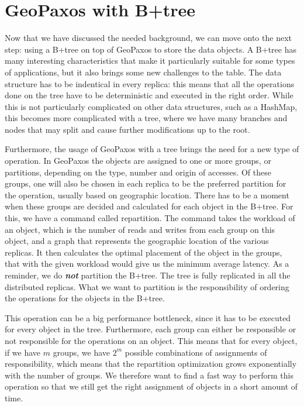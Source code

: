 \chapter{GeoPaxos with B+tree}\label{sec:geopaxos-with-B+tree}
Now that we have discussed the needed background, we can move onto the next step: using a B+tree\citep{b+tree} on top of GeoPaxos to store the data objects. A B+tree has many interesting characteristics that make it particularly suitable for some types of applications, but it also brings some new challenges to the table. The data structure has to be indentical in every replica: this means that all the operations done on the tree have to be deterministic and executed in the right order. While this is not particularly complicated on other data structures, such as a HashMap, this becomes more complicated with a tree, where we have many branches and nodes that may split and cause further modifications up to the root.

Furthermore, the usage of GeoPaxos with a tree brings the need for a new type of operation. In GeoPaxos the objects are assigned to one or more groups, or partitions, depending on the type, number and origin of accesses. Of these groups, one will also be chosen in each replica to be the preferred partition for the operation, usually based on geographic location. There has to be a moment when these groups are decided and calculated for each object in the B+tree. For this, we have a command called repartition. The command takes the workload of an object, which is the number of reads and writes from each group on this object, and a graph that represents the geographic location of the various replicas. It then calculates the optimal placement of the object in the groups, that with the given workload would give us the minimum average latency. As a reminder, we do \textbf{\emph{not}} partition the B+tree. The tree is fully replicated in all the distributed replicas. What we want to partition is the responsibility of ordering the operations for the objects in the B+tree.

This operation can be a big performance bottleneck, since it has to be executed for every object in the tree. Furthermore, each group can either be responsible or not responsible for the operations on an object. This means that for every object, if we have $m$ groups, we have $2^m$ possible combinations of assignments of responsibility, which means that the repartition optimization grows exponentially with the number of groups. We therefore want to find a fast way to perform this operation so that we still get the right assignment of objects in a short amount of time.


